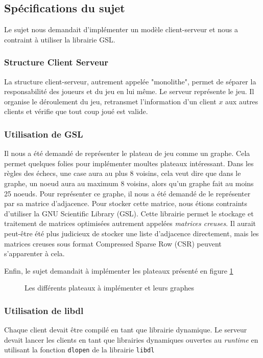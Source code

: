 \subsection{Spécifications du sujet}
Le sujet nous demandait d'implémenter un modèle client-serveur et nous a
contraint à utiliser la librairie GSL.

\subsubsection{Structure Client Serveur}

La structure client-serveur, autrement appelée "monolithe", permet de séparer
la responsabilité des joueurs et du jeu en lui même. Le serveur représente le jeu. Il organise le
déroulement du jeu, retransmet l'information d'un client $x$ aux autres clients et vérifie que tout coup joué est valide.

\subsubsection{Utilisation de GSL}

Il nous a été demandé de représenter le plateau de jeu comme un graphe.
Cela permet quelques folies pour implémenter moultes plateaux intéressant.
Dans les règles des échecs, une case aura au plus 8 voisins, cela veut dire que dans le graphe, un noeud aura au maximum 8 voisins, alors qu'un graphe fait au moins 25 noeuds.
Pour représenter ce graphe, il nous a été demandé de le représenter par sa matrice d'adjacence.
Pour stocker cette matrice, nous étions contraints d'utiliser la GNU Scientific Library (GSL).
Cette librairie permet le stockage et traitement de matrices optimisées autrement appelées \textit{matrices creuses}.
Il aurait peut-être été plus judicieux de stocker une liste d'adjacence directement, mais les matrices creuses sous format Compressed Sparse Row (CSR) peuvent s'apparenter à cela.

Enfin, le sujet demandait à implémenter les plateaux présenté en figure \ref{fig:all-boards}

\begin{figure}[H]
	\centering

	\caption{Les différents plateaux à implémenter et leurs graphes}
	\label{fig:all-boards}
\end{figure}

\subsubsection{Utilisation de libdl}

Chaque client devait être compilé en tant que librairie dynamique.
Le serveur devait lancer les clients en tant que librairies dynamiques ouvertes
au \textit{runtime} en utilisant la fonction \verb|dlopen| de la librairie \verb|libdl|